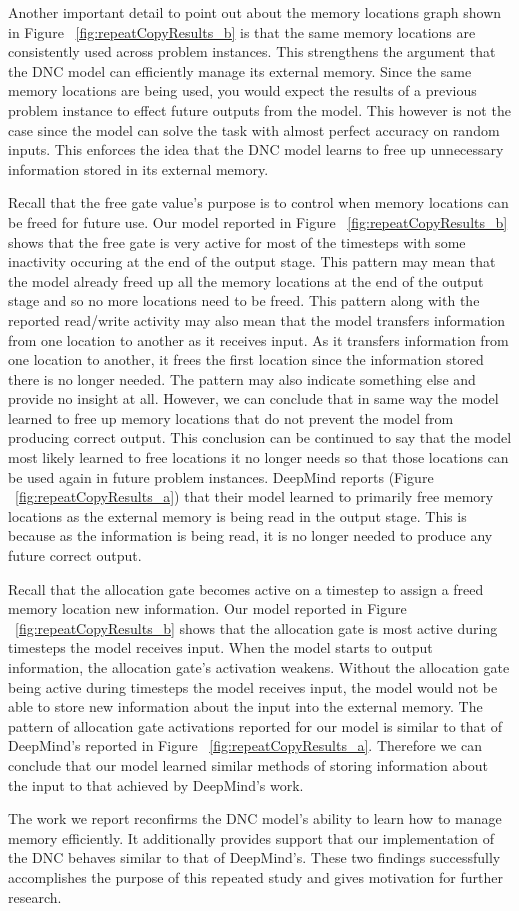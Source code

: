 Another important detail to point out about the memory locations graph shown
in Figure ~\ref{fig:repeatCopyResults_b} is that the same memory locations
are consistently used across problem instances. This strengthens the argument
that the DNC model can efficiently manage its external memory. Since the same
memory locations are being used, you would expect the results of a previous
problem instance to effect future outputs from the model. This however is not
the case since the model can solve the task with almost perfect accuracy on
random inputs. This enforces the idea that the DNC model learns to free up
unnecessary information stored in its external memory.

Recall that the free gate value's purpose is to control when memory locations
can be freed for future use. Our model reported in
Figure ~\ref{fig:repeatCopyResults_b} shows that the free gate is very active
for most of the timesteps with some inactivity occuring at the end of the
output stage. This pattern may mean that the model already freed up all the
memory locations at the end of the output stage and so no more locations need
to be freed. This pattern along with the reported read/write activity may also
mean that the model transfers information from one location to another as it
receives input. As it transfers information from one location to another, it
frees the first location since the information stored there is no longer
needed. The pattern may also indicate something else and provide no insight at
all. However, we can conclude that in same way the model learned to free up
memory locations that do not prevent the model from producing correct output.
This conclusion can be continued to say that the model most likely learned to
free locations it no longer needs so that those locations can be used again in
future problem instances. DeepMind reports
(Figure ~\ref{fig:repeatCopyResults_a}) that their model learned to primarily
free memory locations as the external memory is being read in the output stage.
This is because as the information is being read, it is no longer needed to
produce any future correct output.

Recall that the allocation gate becomes active on a timestep to assign a freed
memory location new information. Our model reported in
Figure ~\ref{fig:repeatCopyResults_b} shows that the allocation gate is most
active during timesteps the model receives input. When the model starts to
output information, the allocation gate's activation weakens. Without the
allocation gate being active during timesteps the model receives input, the
model would not be able to store new information about the input into the
external memory. The pattern of allocation gate activations reported for our
model is similar to that of DeepMind's reported in
Figure ~\ref{fig:repeatCopyResults_a}. Therefore we can conclude that our model
learned similar methods of storing information about the input to that
achieved by DeepMind's work.

The work we report reconfirms the DNC model's ability to learn how to manage
memory efficiently. It additionally provides support that our implementation
of the DNC behaves similar to that of DeepMind's. These two findings
successfully accomplishes the purpose of this repeated study and gives
motivation for further research.
